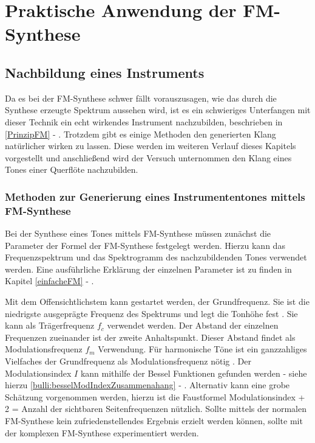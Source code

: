 \section{Praktische Anwendung der FM-Synthese}
\FloatBarrier
\subsection{Nachbildung eines Instruments}
Da es bei der FM-Synthese schwer fällt vorauszusagen, wie das durch die Synthese erzeugte Spektrum aussehen wird, ist es ein schwieriges Unterfangen mit dieser Technik ein echt wirkendes Instrument nachzubilden, beschrieben in \ref{PrinzipFM} - .
Trotzdem gibt es einige Methoden den generierten Klang natürlicher wirken zu lassen. Diese werden im weiteren Verlauf dieses Kapitels vorgestellt und anschließend wird der Versuch unternommen den Klang eines Tones einer Querflöte nachzubilden.

\FloatBarrier
\subsubsection{Methoden zur Generierung eines Instrumententones mittels FM-Synthese}

Bei der Synthese eines Tones mittels FM-Synthese müssen zunächst die Parameter der Formel der FM-Synthese festgelegt werden. Hierzu kann das Frequenzspektrum und das Spektrogramm des nachzubildenden Tones verwendet werden. Eine ausführliche Erklärung der einzelnen Parameter ist zu finden in Kapitel \ref{einfacheFM} - . 

Mit dem Offensichtlichstem kann gestartet werden, der Grundfrequenz. Sie ist die niedrigste ausgeprägte Frequenz des Spektrums und legt die Tonhöhe fest \cite[S. 53]{barkowsky}. Sie kann als Trägerfrequenz $f_c$ verwendet werden. Der Abstand der einzelnen Frequenzen zueinander ist der zweite Anhaltspunkt. Dieser Abstand findet als Modulationsfrequenz $f_m$ Verwendung. Für harmonische Töne ist ein ganzzahliges Vielfaches der Grundfrequenz als Modulationsfrequenz nötig \cite[S. 528]{chowningPaper}. Der Modulationsindex $I$ kann mithilfe der Bessel Funktionen gefunden werden - siehe hierzu \ref{bulli:besselModIndexZusammenahang} - . Alternativ kann eine grobe Schätzung vorgenommen werden, hierzu ist die Faustformel Modulationsindex + 2 = Anzahl der sichtbaren Seitenfrequenzen nützlich. Sollte mittels der normalen FM-Synthese kein zufriedenstellendes Ergebnis erzielt werden können, sollte mit der komplexen FM-Synthese experimentiert werden. 

